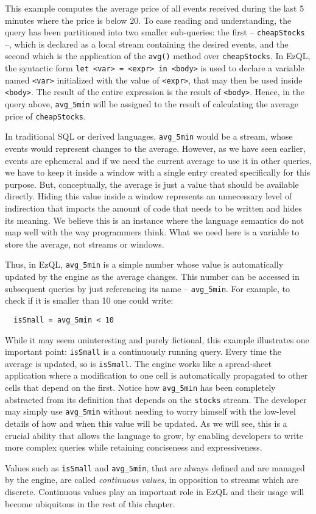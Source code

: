 \documentclass[a4,11pt]{report}
\begin{document}
This example computes the average price of all events received during
the last 5 minutes where the price is below 20. To ease reading and
understanding, the query has been partitioned into two smaller
sub-queries: the first -- \verb=cheapStocks= --, which is declared as
a local stream containing the desired events, and the second which is
the application of the \verb=avg()= method over \verb=cheapStocks=. In
EzQL, the syntactic form \verb!let <var> = <expr> in <body>! is used
to declare a variable named \verb=<var>= initialized with the value of
\verb=<expr>=, that may then be used inside \verb=<body>=. The result of
the entire expression is the result of \verb=<body>=. Hence, in the query
above, \verb=avg_5min= will be assigned to the result of calculating
the average price of \verb=cheapStocks=.

In traditional SQL or derived languages, \verb=avg_5min= would be a
stream, whose events would represent changes to the average. However,
as we have seen earlier, events are ephemeral and if we need the
current average to use it in other queries, we have to keep it inside
a window with a single entry created specifically for this
purpose. But, conceptually, the average is just a value that should be
available directly. Hiding this value inside a window represents an
unnecessary level of indirection that impacts the amount of code that
needs to be written and hides its meaning.  We believe this is an
instance where the language semantics do not map well with the way
programmers think. What we need here is a variable to store the
average, not streams or windows.

Thus, in EzQL, \verb=avg_5min= is a simple number whose value is
automatically updated by the engine as the average changes. This
number can be accessed in subsequent queries by just referencing its
name -- \verb=avg_5min=. For example, to check if it is smaller than
10 one could write:

\begin{lstlisting}
  isSmall = avg_5min < 10
\end{lstlisting}

While it may seem uninteresting and purely fictional, this example
illustrates one important point: \verb=isSmall= is a continuously
running query. Every time the average is updated, so is
\verb=isSmall=. The engine works like a spread-sheet application where
a modification to one cell is automatically propagated to other cells
that depend on the first. Notice how \verb=avg_5min= has been
completely abstracted from its definition that depends on the
\verb=stocks= stream. The developer may simply use \verb=avg_5min=
without needing to worry himself with the low-level details of how and
when this value will be updated. As we will see, this is a crucial
ability that allows the language to grow, by enabling developers to
write more complex queries while retaining conciseness and
expressiveness.

Values such as \verb=isSmall= and \verb=avg_5min=, that are always
defined and are managed by the engine, are called \emph{continuous
  values}, in opposition to streams which are discrete. Continuous
values play an important role in EzQL and their usage will become
ubiquitous in the rest of this chapter.
\end{document}
